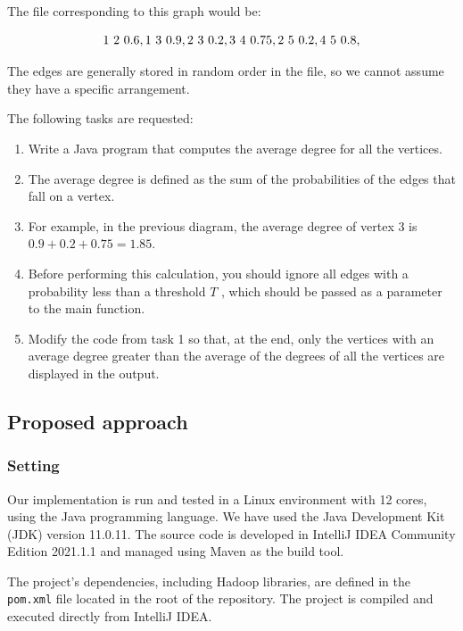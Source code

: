 \documentclass[acmlarge]{acmart}
\begin{document}
The file corresponding to this graph would be:

\[
  1 \ 2 \ 0.6, \\
  1 \ 3 \ 0.9, \\
  2 \ 3 \ 0.2, \\
  3 \ 4 \ 0.75, \\
  2 \ 5 \ 0.2, \\
  4 \ 5 \ 0.8,
\]

The edges are generally stored in random order in the file, so we cannot assume they have a specific arrangement.

The following tasks are requested:

\begin{enumerate}
  \item Write a Java program that computes the average degree for all the vertices.
  \item The average degree is defined as the sum of the probabilities of the edges that fall on a vertex.
  \item For example, in the previous diagram, the average degree of vertex 3 is \( 0.9 + 0.2 + 0.75 = 1.85 \).
  \item Before performing this calculation, you should ignore all edges with a probability less than a threshold \( T \)
        , which should be passed as a parameter to the main function.
  \item Modify the code from task 1 so that, at the end, only the vertices with an average degree greater than the
        average of the degrees of all the vertices are displayed in the output.

\end{enumerate}

\subsection{Proposed approach}
\subsubsection{Setting}
Our implementation is run and tested in a Linux environment with 12 cores, using the Java programming language.
We have used the Java Development Kit (JDK) version 11.0.11.
The source code is developed in IntelliJ IDEA Community Edition 2021.1.1 and managed using Maven as the build tool.

The project’s dependencies, including Hadoop libraries, are defined in the \texttt{pom.xml} file located in the root of
the repository.
The project is compiled and executed directly from IntelliJ IDEA.
\end{document}
